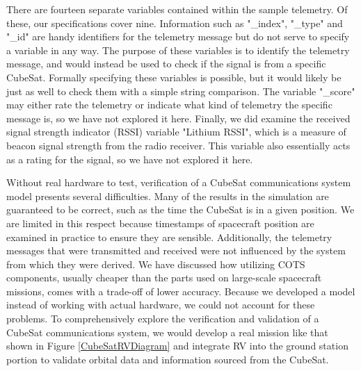 \documentclass[conf]{new-aiaa}
\begin{document}
There are fourteen separate variables contained within the sample telemetry. Of these, our specifications cover nine. Information such as "\_index", "\_type" and "\_id" are handy identifiers for the telemetry message but do not serve to specify a variable in any way. The purpose of these variables is to identify the telemetry message, and would instead be used to check if the signal is from a specific CubeSat. Formally specifying these variables is possible, but it would likely be just as well to check them with a simple string comparison. The variable "\_score" may either rate the telemetry or indicate what kind of telemetry the specific message is, so we have not explored it here. Finally, we did examine the received signal strength indicator (RSSI) variable "Lithium RSSI", which is a measure of beacon signal strength from the radio receiver. This variable also essentially acts as a rating for the signal, so we have not explored it here.

Without real hardware to test, verification of a CubeSat communications system model presents several difficulties. Many of the results in the simulation are guaranteed to be correct, such as the time the CubeSat is in a given position. We are limited in this respect because timestamps of spacecraft position are examined in practice to ensure they are sensible. Additionally, the telemetry messages that were transmitted and received were not influenced by the system from which they were derived. We have discussed how utilizing COTS components, usually cheaper than the parts used on large-scale spacecraft missions, comes with a trade-off of lower accuracy. Because we developed a model instead of working with actual hardware, we could not account for these problems. To comprehensively explore the verification and validation of a CubeSat communications system, we would develop a real mission like that shown in Figure \ref{CubeSatRVDiagram} and integrate RV into the ground station portion to validate orbital data and information sourced from the CubeSat.
\end{document}
